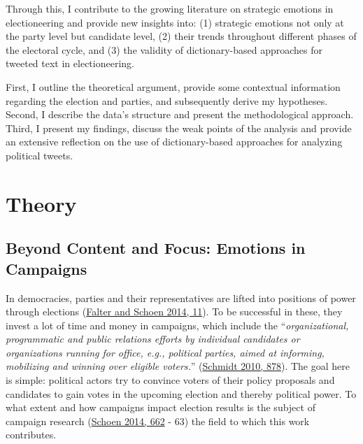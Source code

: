 \documentclass[a4paper,11pt]{article}
\begin{document}
Through this, I contribute to the growing literature on strategic emotions in electioneering and provide new insights into: (1) strategic emotions not only at the party level but candidate level, (2) their trends throughout different phases of the electoral cycle, and (3) the validity of dictionary-based approaches for tweeted text in electioneering.

First, I outline the theoretical argument, provide some contextual information regarding the election and parties, and subsequently derive my hypotheses. Second, I describe the data's structure and present the methodological approach. Third, I present my findings, discuss the weak points of the analysis and provide an extensive reflection on the use of dictionary-based approaches for analyzing political tweets.

\hypertarget{theory}{%
\section{Theory}\label{theory}}

\hypertarget{emotionsincampaigns}{%
\subsection{Beyond Content and Focus: Emotions in Campaigns}\label{emotionsincampaigns}}

In democracies, parties and their representatives are lifted into positions of power through elections (\protect\hyperlink{ref-falterHandbuchWahlforschung2014}{Falter and Schoen 2014, 11}). To be successful in these, they invest a lot of time and money in campaigns, which include the ``\emph{organizational, programmatic and public relations efforts by individual candidates or organizations running for office, e.g., political parties, aimed at informing, mobilizing and winning over eligible voters.}'' (\protect\hyperlink{ref-schmidtWoerterbuchZurPolitik2010}{Schmidt 2010, 878}). The goal here is simple: political actors try to convince voters of their policy proposals and candidates to gain votes in the upcoming election and thereby political power. To what extent and how campaigns impact election results is the subject of campaign research (\protect\hyperlink{ref-schoenWahlkampfforschung2014}{Schoen 2014, 662} - 63) the field to which this work contributes.
\end{document}
